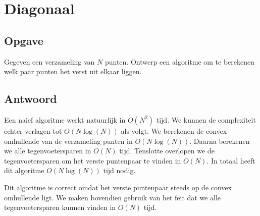 \documentclass[examenvragen.tex]{subfiles}
\begin{document}
\section{Diagonaal}
\subsection{Opgave}
Gegeven een verzameling van $N$ punten. Ontwerp een algoritme om te berekenen welk paar punten het verst uit elkaar liggen.

\subsection{Antwoord}
Een naief algoritme werkt natuurlijk in $O(N^2)$ tijd. We kunnen de complexiteit echter verlagen tot $O(N\log(N))$ als volgt.
We berekenen de convex omhullende van de verzameling punten in $O(N\log(N))$.
Daarna berekenen we alle tegenvoetersparen in $O(N)$ tijd.
Tenslotte overlopen we de tegenvoetersparen om het verste puntenpaar te vinden in $O(N)$. In totaal heeft dit algoritme $O(N\log(N))$ tijd nodig.

Dit algoritme is correct omdat het verste puntenpaar steeds op de convex omhullende ligt. We maken bovendien gebruik van het feit dat we alle tegenvoetersparen kunnen vinden in $O(N)$ tijd.
\end{document}
